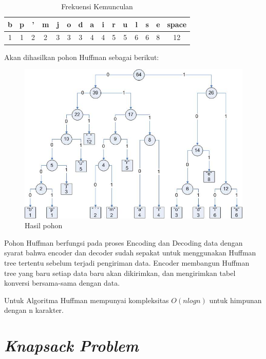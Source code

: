 \begin{table}[h]
\begin{center}
\begin{tabular}{|c|c|c|c|c|c|c|c|c|c|c|c|c|c|c|}
\hline
b&p&'&m&j&o&d&a&i&r&u&l&s&e&space\\
\hline
1&1&2&2&3&3&3&4&4&5&5&6&6&8&12\\
\hline
\end{tabular}
\caption{Frekuensi Kemunculan}
\end{center}
\end{table}

Akan dihasilkan pohon Huffman sebagai berikut:

\begin{figure}[htbp]
\begin{center}
	\includegraphics[scale=0.6]{fig/sunario-3/Huffman.jpg}%
	\caption{Hasil pohon }%
	\label{fig:Huffman Tree}%
\end{center}
\end{figure}

Pohon Huffman berfungsi pada proses Encoding dan Decoding data dengan syarat bahwa encoder dan decoder sudah sepakat untuk menggunakan Huffman tree tertentu sebelum terjadi pengiriman data. Encoder membangun Huffman tree yang baru setiap data baru akan dikirimkan, dan mengirimkan tabel konversi bersama-sama dengan data.

Untuk Algoritma Huffman mempunyai kompleksitas $O(n log n)$ untuk himpunan dengan n karakter.	

\section{\textit{Knapsack Problem}}

